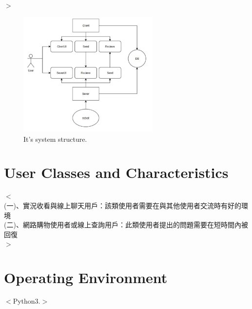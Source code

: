 \documentclass{scrreprt}
\begin{document}
\begin{CJK}{UTF8}{bkai}
$>$

\begin{figure}[h]
\begin{center}
\includegraphics[width=7cm]{structure.jpg}
\end{center}
\caption{It's system structure.}
\label{fig:1}
\end{figure}






\section{User Classes and Characteristics}
$<$\\
(一)、實況收看與線上聊天用戶：該類使用者需要在與其他使用者交流時有好的環境\\
(二)、網路購物使用者或線上查詢用戶：此類使用者提出的問題需要在短時間內被回復\\
$>$

\section{Operating Environment}
$<$Python3.$>$



　　　%


\end{CJK}
\end{document}
